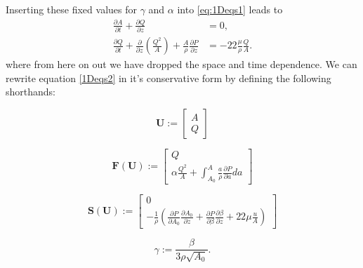 \documentclass[a4paper, oneside]{discothesis}
\begin{document}
Inserting these fixed values for $\gamma$ and $\alpha$ into  \autoref{eq:1Deqs1} leads to 
\begin{equation}
		\begin{aligned} 
			\frac{\partial A}{\partial t} + \frac{\partial Q}{\partial z} &= 0, \\ 
			\frac{\partial Q}{\partial t} + \frac{\partial}{\partial z}\left(\frac{Q^2}{A} \right) + \frac{A}{\rho} \frac{\partial P}{\partial z} &= -22 \frac{\mu}{\rho} \frac{Q}{A}.
		\end{aligned} \label{1Deqs2}
\end{equation}
where from here on out we have dropped the space and time dependence.
We can rewrite equation \ref{1Deqs2} in it's conservative form by defining the following shorthands:

\begin{equation}
	\mathbf{U} := 
		\begin{bmatrix}
			A \\
			Q
		\end{bmatrix}
\end{equation}

\begin{equation}
	\mathbf{F} \left( \mathbf{U} \right) := 
		\begin{bmatrix}
			Q \\
			\alpha \frac{Q^2}{A} + \int_{A_0}^{A} \frac{a}{\rho}\frac{\partial P}{\partial a} da
		\end{bmatrix}
\end{equation}

\begin{equation}
	\mathbf{S} \left( \mathbf{U} \right) := 
		\begin{bmatrix}
			0 \\
			-\frac{1}{\rho} \left( \frac{\partial P}{\partial A_0} \frac{\partial A_0}{\partial z} + \frac{\partial P}{\partial \beta} \frac{\partial \beta}{\partial z} + 22\mu\frac{u}{A} \right)
		\end{bmatrix}
\end{equation}

\begin{equation}
	\gamma := \frac{\beta}{3\rho\sqrt{A_0}}.
\end{equation}
\end{document}
